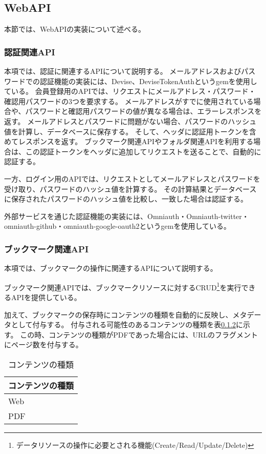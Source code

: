 \subsection{WebAPI}
本節では、WebAPIの実装について述べる。

\subsubsection{認証関連API}
本項では、認証に関連するAPIについて説明する。
メールアドレスおよびパスワードでの認証機能の実装には、Devise\cite{}、DeviseTokenAuth\cite{}というgemを使用している。
会員登録用のAPIでは、リクエストにメールアドレス・パスワード・確認用パスワードの3つを要求する。
メールアドレスがすでに使用されている場合や、パスワードと確認用パスワードの値が異なる場合は、エラーレスポンスを返す。
メールアドレスとパスワードに問題がない場合、パスワードのハッシュ値を計算し、データベースに保存する。
そして、ヘッダに認証用トークンを含めてレスポンスを返す。
ブックマーク関連APIやフォルダ関連APIを利用する場合は、この認証トークンをヘッダに追加してリクエストを送ることで、自動的に認証する。

一方、ログイン用のAPIでは、リクエストとしてメールアドレスとパスワードを受け取り、パスワードのハッシュ値を計算する。
その計算結果とデータベースに保存されたパスワードのハッシュ値を比較し、一致した場合は認証する。

外部サービスを通じた認証機能の実装には、Omniauth\cite{}・Omniauth-twitter・omniauth-github・omniauth-google-oauth2というgemを使用している。

\subsubsection{ブックマーク関連API}
本項では、ブックマークの操作に関連するAPIについて説明する。


ブックマーク関連APIでは、ブックマークリソースに対するCRUD\footnote{データリソースの操作に必要とされる機能(Create/Read/Update/Delete)}を実行できるAPIを提供している。

加えて、ブックマークの保存時にコンテンツの種類を自動的に反映し、メタデータとして付与する。
付与される可能性のあるコンテンツの種類を表\ref{}に示す。
この時、コンテンツの種類がPDFであった場合には、URLのフラグメントにページ数を付与する。

\begin{table}[htbp]
  \label{tb:ios-bookmark-response}
  \caption{コンテンツの種類}
  \begin{center}
    \begin{tabular}{|l|}
    \hline
    コンテンツの種類  \\ \hline
    Web \\ \hline
    PDF \\ \hline
    \end{tabular}
  \end{center}
\end{table}


